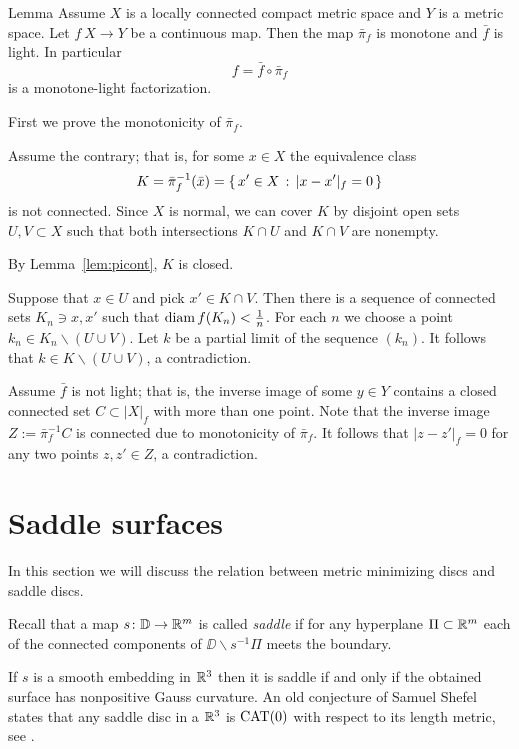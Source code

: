 \documentclass{article}
\begin{document}
\begin{thm}{Lemma}\label{cor:fiberconnected}
Assume $X$ is a locally connected compact metric space and $Y$ is a metric space.
Let $f\:X\to Y$ be a continuous map.
Then the map $\bar \pi_f$ is monotone and $\bar f$ is light.
In particular 
\[f=\bar f\circ\bar\pi_f\]
is a monotone-light factorization. 
\end{thm}

First we prove the monotonicity of $\bar\pi_f$.

Assume the contrary;
that is, for some $x\in X$ the equivalence class 
\[K=\bar\pi_f^{-1}(\bar x)=\{\,{x'\in X}\,:\,{|x-x'|_f=0}\,\}\]
is not connected. Since $X$ is normal, we
can cover $K$ by disjoint open sets $U,V\subset X$ such that both intersections
$K\cap U$ and $K\cap V$ are nonempty.

By Lemma~\ref{lem:picont}, $K$ is closed.

Suppose that $x\in U$ and pick $x'\in K\cap V$.
Then there is a sequence of connected sets $K_n\ni x,x'$ such that $\mathop{\rm diam}\nolimits f(K_n)<\tfrac1n$.
For each $n$ we choose a point $k_n\in K_n\backslash (U\cup V)$.
Let $k$ be a partial limit of the sequence $(k_n)$.
It follows that $k\in K\backslash (U\cup V)$, a contradiction. 

Assume $\bar f$ is not light;
that is, the inverse image of some $y\in Y$ contains a closed connected set $C\subset |X|_f$ with more than one point.  
Note that the inverse image $Z:=\bar\pi_f^{-1}C$ is connected due to monotonicity of $\bar\pi_f$. 
It follows that $|z-z'|_f=0$ for any two points $z,z'\in Z$, a contradiction.
\qeds








\section{Saddle surfaces}\label{sec:smooth}

In this section we will discuss the relation between metric minimizing discs and saddle discs.

Recall that a map $s\colon\mathbb{D}\to \mathbb{R}^m$ is called \emph{saddle} if for any hyperplane $\Pi\subset\mathbb{R}^m$ each of the connected components of $\DD\backslash s^{-1}\Pi$ meets the boundary.

If $s$ is a smooth embedding in $\mathbb{R}^3$ then it is saddle if and only if the  obtained surface has nonpositive Gauss curvature. 
An old conjecture of Samuel Shefel states that any saddle disc in a $\mathbb{R}^3$ is $\mathop{\rm CAT}\nolimits(0)$ with respect to its length metric, see \cite{shefel-3D}.
\end{document}
